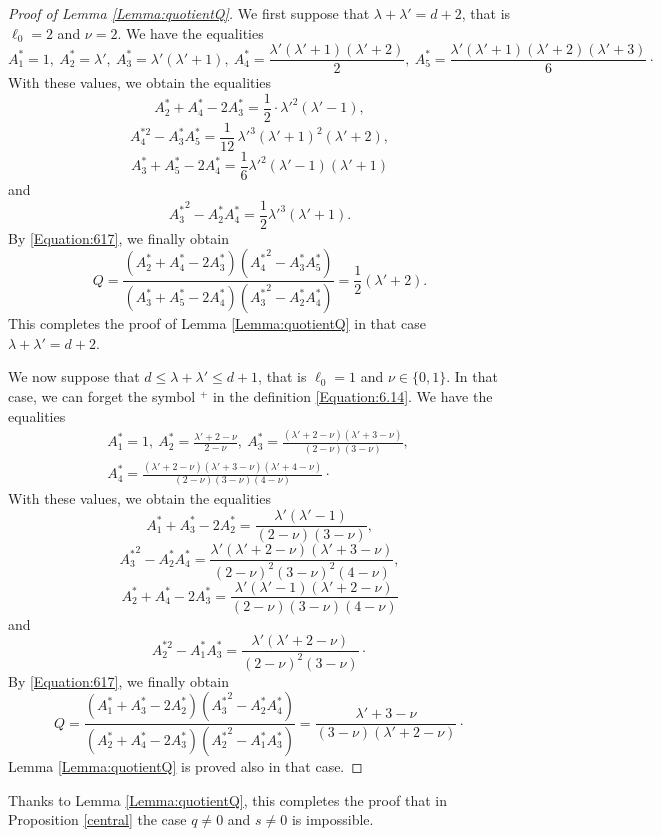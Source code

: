 \documentclass[10pt]{article}
\theoremstyle{definition}
\numberwithin{equation}{section}
\begin{document}
\begin{proof}[Proof of Lemma \ref{Lemma:quotientQ}] We first suppose that $\lambda +\lambda' =d+2$, that is $\ell_0 =2$ and $\nu=2$. We have
the equalities
\[
A_1^*=1,\ 
A_2^* = \lambda', \ 
A_3^* = \lambda' (\lambda'+1), \ A_4^* = \frac{\lambda'(\lambda'+1) (\lambda'+2)}2, \ A_5^*= \frac{\lambda' (\lambda'+1) (\lambda'+2) (\lambda' +3)}6 
\cdotp
\] 
With these values, we obtain the equalities 
\[
A_2^* +A_4^* -2 A_3^* =\frac 12 \cdot \lambda'^2 (\lambda'-1),
\]
\[
 A_4^{*2}-A^*_3A^*_5= \frac 1{12} \, \lambda'^3 (\lambda'+1)^2 (\lambda '+2),
 \]
 \[
 A^*_3+A^*_5-2A^*_4=\frac 16 \lambda'^2 (\lambda'-1)(\lambda'+1)
 \]
 and
 \[
 {A^*_3}^2-A^*_2A^*_4=\frac 12 \lambda'^3 (\lambda'+1).
 \] 
 By \eqref{Equation:617}, we finally obtain 
 \[
 Q=\frac{
(A^*_2+A^*_4-2A^*_3) ( {A^*_4}^2-A^*_3A^*_5)}
{(A^*_3+A^*_5-2A^*_4)( {A^*_3}^2-A^*_2A^*_4)}
= \frac 12 (\lambda' +2).
 \]
This completes the proof of
Lemma \ref{Lemma:quotientQ} in that case $\lambda +\lambda '= d+2$.

We now suppose that $d\leqslant \lambda +\lambda'\leqslant d+1$, that is $\ell_0=1$ and $\nu\in\{0,1\}$. In that case, we can forget the symbol ${}^+$ in the definition \eqref{Equation:6.14}. 
We have the equalities
\[
\begin{gathered}
A_1^* = 1, \
A_2^* = \frac{\lambda'+2-\nu}{2-\nu}, \ 
A_3^* = \frac{(\lambda'+2-\nu)(\lambda'+3-\nu)}{(2-\nu)(3-\nu)}, \ 
\\
A_4^* = \frac{(\lambda'+2-\nu)(\lambda'+3-\nu)(\lambda'+4-\nu)}{(2-\nu)(3-\nu)(4-\nu)}\cdotp
\end{gathered}
\]
With these values, we obtain the equalities 
\[
A_1^* +A_3^* -2 A_2^* =\frac {\lambda'(\lambda'-1)}{(2-\nu)(3-\nu)},
\]
\[
 {A^*_3}^2-A^*_2A^*_4=\frac {\lambda'(\lambda'+2-\nu)(\lambda'+3-\nu)}{(2-\nu)^2(3-\nu)^2(4-\nu)},
 \]
 \[
 A^*_2+A^*_4-2A^*_3= \frac {\lambda'(\lambda'-1)(\lambda'+2-\nu)}{(2-\nu)(3-\nu)(4-\nu)}
 \]
 and 
\[
 A_2^{*2}-A^*_1A^*_3= \frac {\lambda' (\lambda'+2-\nu)}{(2-\nu)^2(3-\nu)}\cdotp
 \]
 By \eqref{Equation:617}, we finally obtain 
 \[
 Q=\frac{
(A^*_1+A^*_3-2A^*_2) ( {A^*_3}^2-A^*_2A^*_4)}
{(A^*_2+A^*_4-2A^*_3)( {A^*_2}^2-A^*_1A^*_3)}
= \frac{\lambda' +3-\nu}{(3-\nu)(\lambda'+2-\nu)}\cdotp
 \]
 Lemma \ref{Lemma:quotientQ} is proved also in that case.
 \end{proof}
 
 Thanks to Lemma \ref{Lemma:quotientQ}, this completes the proof that in Proposition \ref{central} the case $q\neq 0$ and $s\neq 0$ is impossible. 
 
\end{document}

